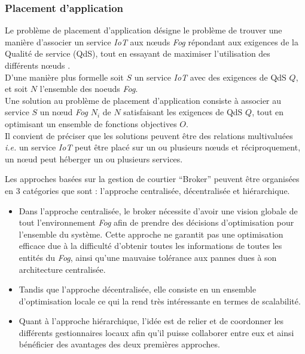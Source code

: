 \subsubsection{Placement d'application}
Le problème de placement d'application désigne le problème de trouver une manière d'associer un service \emph{IoT} aux nœuds \emph{Fog} répondant aux exigences de la Qualité de service (QdS), tout en essayant de maximiser l'utilisation des différents nœuds .\\
D'une manière plus formelle soit $S$ un service \emph{IoT} avec des exigences de QdS $Q$, et soit $N$ l'ensemble des noeuds \emph{Fog}.\\
Une solution au problème de placement d'application consiste à associer au service $S$ un nœud \emph{Fog} $N_{i}$ de $N$ satisfaisant les exigences de QdS $Q$, tout en optimisant un ensemble de fonctions objectives $O$.\\
Il convient de préciser que les solutions peuvent être des relations multivaluées \emph{i.e.} un service \emph{IoT} peut être placé sur un ou plusieurs nœuds et réciproquement, un nœud peut héberger un ou plusieurs services.\par
Les approches basées sur la gestion de courtier “Broker” peuvent être organisées en 3 catégories que sont : l'approche centralisée, décentralisée et hiérarchique.
\begin{itemize}
  \item Dans l'approche centralisée, le broker nécessite d'avoir une vision globale de tout l'environnement \emph{Fog} afin de prendre des décisions d'optimisation pour l'ensemble du système. Cette approche ne garantit pas une optimisation efficace due à la difficulté d'obtenir toutes les informations de toutes les entités du \emph{Fog}, ainsi qu'une mauvaise tolérance aux pannes dues à son architecture centralisée.
  \item Tandis que  l'approche décentralisée, elle consiste en un ensemble d'optimisation locale ce qui la rend très intéressante en termes de scalabilité.
  \item Quant à l'approche hiérarchique, l'idée est  de relier et de coordonner les différents gestionnaires locaux afin qu'il puisse collaborer entre eux et ainsi bénéficier des avantages des deux premières approches. 
\end{itemize}

